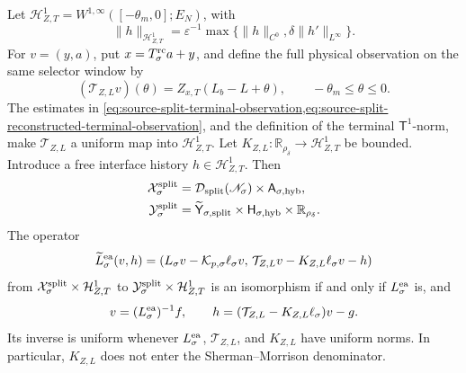\begin{corollary}
Let
\(
 \mathcal H_{Z,T}^1=W^{1,\infty}([-\theta_m,0];E_N)
\), with
\begin{equation}
 \|h\|_{\mathcal H_{Z,T}^1}
 =\varepsilon^{-1}
   \max\{\|h\|_{C^0},\delta\|h'\|_{L^\infty}\}.  \label{eq:terminal-voltage-interface-norm}
\end{equation}
For \(v=(y,a)\), put \(x=T_\sigma^{\rm rc}a+y\), and define the full physical
observation on the same selector window by
\begin{equation}
 (\mathcal T_{Z,L}v)(\theta)
 =Z_{x,T}(L_b-L+\theta),\qquad -\theta_m\le\theta\le0.
                                                               \label{eq:terminal-voltage-full-observation}
\end{equation}
The estimates in
\cref{eq:source-split-terminal-observation,eq:source-split-reconstructed-terminal-observation},
and the definition of the terminal \(\mathsf T^1\)-norm, make
\(\mathcal T_{Z,L}\) a uniform map into \(\mathcal H_{Z,T}^1\).  Let
\(K_{Z,L}:\mathbb R_{\rho_\delta}\to\mathcal H_{Z,T}^1\) be bounded.  Introduce
a free interface history \(h\in\mathcal H_{Z,T}^1\).  Then
\begin{align*}
 \mathcal X_\sigma^{\rm split}
 &=\mathcal D_{\mathrm{split}}(\mathscr N_\sigma)
       \times\mathsf A_{\sigma,\mathrm{hyb}},\\
 \mathcal Y_\sigma^{\rm split}
 &=\widetilde{\mathsf Y}_{\sigma,\mathrm{split}}
       \times\mathsf H_{\sigma,\mathrm{hyb}}
       \times\mathbb R_{\rho_\delta}.
\end{align*}
The operator
\begin{equation}
 \widetilde L_\sigma^{\rm ea}(v,h)
 =\left(
   L_\sigma v-\mathcal K_{p,\sigma}\ell_\sigma v,\,
   \mathcal T_{Z,L}v-K_{Z,L}\ell_\sigma v-h\right)          \label{eq:terminal-history-augmented-event-core}
\end{equation}
from
\(
 \mathcal X_\sigma^{\rm split}\times\mathcal H_{Z,T}^1
\)
to
\(
 \mathcal Y_\sigma^{\rm split}\times\mathcal H_{Z,T}^1
\)
is an isomorphism if and only if \(L_\sigma^{\rm ea}\) is, and
\begin{equation}
 v=(L_\sigma^{\rm ea})^{-1}f,\qquad
 h=(\mathcal T_{Z,L}-K_{Z,L}\ell_\sigma)v-g.     \label{eq:terminal-history-augmented-inverse}
\end{equation}
Its inverse is uniform whenever
\(L_\sigma^{\rm ea}\), \(\mathcal T_{Z,L}\), and \(K_{Z,L}\) have uniform norms.
In particular, \(K_{Z,L}\) does not enter the Sherman--Morrison denominator.


\end{corollary}
